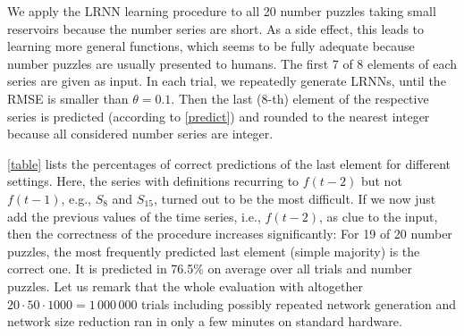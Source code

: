 \documentclass[preprint,12pt,times,authoryear]{elsarticle}%
\theoremstyle{definition}
\begin{document}
We apply the LRNN learning procedure to all 20 number puzzles taking small
reservoirs because the number series are short. As a side effect, this leads to
learning more general functions, which seems to be fully adequate because number
puzzles are usually presented to humans. The first 7 of 8 elements of each
series are given as input. In each trial, we repeatedly generate LRNNs, until the
RMSE is smaller than $\theta=0.1$. Then the last (8-th) element of the
respective series is predicted (according to \cref{predict}) and rounded to the
nearest integer because all considered number series are integer.

\cref{table} lists the percentages of correct predictions of the last
element for different settings. Here, the series with definitions recurring to
$f(t-2)$ but not $f(t-1)$, e.g., $S_8$ and $S_{15}$, turned out to be the most
difficult. If we now just add the previous values of the time series, i.e., $f(t-2)$,
as clue to the input, then the correctness of the procedure increases
significantly: For 19 of 20 number puzzles, the most frequently predicted last
element (simple majority) is the correct one. It is predicted in 76.5\% on
average over all trials and number puzzles. Let us remark that the whole
evaluation with altogether $20 \cdot 50 \cdot 1000 = 1\,000\,000$ trials
including possibly repeated network generation and network size reduction ran in
only a few minutes on standard hardware.
\end{document}
